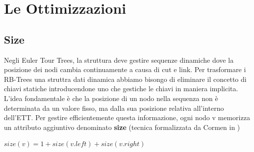 \setchapterpreamble[u]{\margintoc}
\chapter{Le Ottimizzazioni}

\section{Size}
Negli Euler Tour Trees, la struttura deve gestire sequenze 
dinamiche dove la posizione dei nodi cambia continuamente a
causa di cut e link. Per trasformare i RB-Trees una struttra
dati dinamica abbiamo bisongo di eliminare il concetto
di chiavi statiche introducendone uno che gestiche le chiavi 
in maniera implicita.\\
L'idea fondamentale è che la posizione di un nodo nella 
sequenza non è determinata da un valore fisso, ma dalla 
sua posizione relativa all'interno dell'ETT.
Per gestire efficientemente questa informazione, 
ogni nodo v memorizza un attributo aggiuntivo denominato 
\textbf{size} (tecnica formalizzata da Cormen in \cite{CLRS09})

\begin{definition}
    $size(v) = 1 + size(v.left) +size(v.right)$ 
\end{definition}

